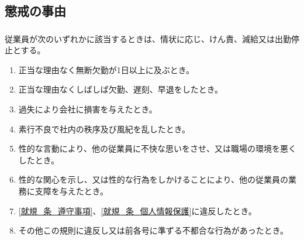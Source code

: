 \documentclass{jsarticle}
\begin{document}
\subsection{懲戒の事由}
\label{就規_条_懲戒の事由}
\subsubsection{}
\label{就規_項_懲戒の事由}
従業員が次のいずれかに該当するときは、情状に応じ、けん責、減給又は出勤停止とする。
  \begin{enumerate}
    \item 正当な理由なく無断欠勤が1日以上に及ぶとき。
    \item 正当な理由なくしばしば欠勤、遅刻、早退をしたとき。
    \item 過失により会社に損害を与えたとき。
    \item 素行不良で社内の秩序及び風紀を乱したとき。
    \item 性的な言動により、他の従業員に不快な思いをさせ、又は職場の環境を悪くしたとき。
    \item 性的な関心を示し、又は性的な行為をしかけることにより、他の従業員の業務に支障を与えたとき。
    \item \ref{就規_条_遵守事項}、\ref{就規_条_個人情報保護}に違反したとき。
    \item その他この規則に違反し又は前各号に準ずる不都合な行為があったとき。
  \end{enumerate}
\end{document}
